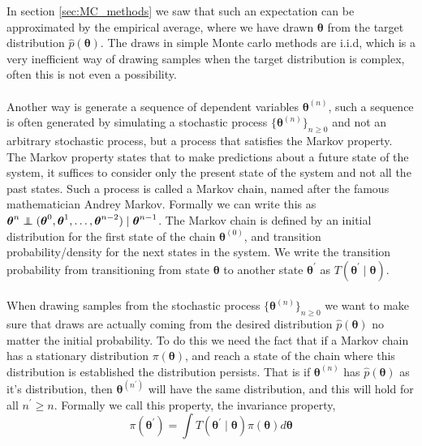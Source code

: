 In section \ref{sec:MC_methods} we saw that such an expectation can be approximated by the empirical average, where we have drawn $\boldsymbol{\theta}$ from the target distribution $\hat{p}(\boldsymbol{\theta})$. The draws in simple Monte carlo methods are i.i.d, which is a very inefficient way of drawing samples when the target distribution is complex, often this is not even a possibility.\\
\\
Another way is generate a sequence of dependent variables $\boldsymbol{\theta}^{(n)}$, such a sequence is often generated by simulating a stochastic process $\{\boldsymbol{\theta}^{(n)}\}_{n\geq 0}$ and not an arbitrary stochastic process, but a process that satisfies the Markov property. The Markov property states that to make predictions about a future state of the system, it suffices to consider only the present state of the system and not all the past states. Such a process is called a Markov chain, named after the famous mathematician Andrey Markov. Formally we can write this as $ \boldsymbol{\theta}^{n} \independent (\boldsymbol{\theta}^0,\boldsymbol{\theta}^1, \ldots, \boldsymbol{\theta}^{n-2}) \mid \boldsymbol{\theta}^{n-1}$. The Markov chain is defined by an initial distribution for the first state of the chain $\boldsymbol{\theta}^{(0)}$, and transition probability/density for the next states in the system. We write the transition probability from transitioning from state $\boldsymbol{\theta}$ to another state $\boldsymbol{\theta}^\prime$ as $T(\boldsymbol{\theta}^\prime\mid \boldsymbol{\theta})$. \\
\\
When drawing samples from the stochastic process $\{\boldsymbol{\theta}^{(n)}\}_{n\geq 0}$ we want to make sure that draws are actually coming from the desired distribution $\hat{p}(\boldsymbol{\theta})$ no matter the initial probability. To do this we need the fact that if a Markov chain has a stationary distribution $\pi(\boldsymbol{\theta})$, and reach a state of the chain where this distribution is established the distribution persists. That is if $\boldsymbol{\theta}^{(n)}$ has $\hat{p}(\boldsymbol{\theta})$ as it's distribution, then  $\boldsymbol{\theta}^{(n^\prime)}$ will have the same distribution, and this will hold for all $n^\prime\geq n$. Formally we call this property, the invariance property,
\begin{equation*}
    \pi(\boldsymbol{\theta}^\prime)=\int T(\boldsymbol{\theta}^\prime\mid \boldsymbol{\theta}) \pi(\boldsymbol{\theta})d\boldsymbol{\theta}
\end{equation*}
